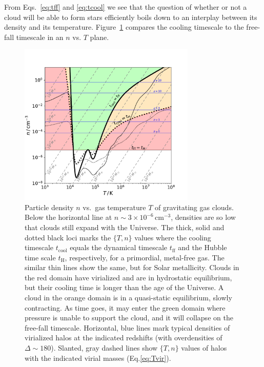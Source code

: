 \documentclass[useAMS]{aa}
\begin{document}
From Eqs.~\ref{eq:tff} and \ref{eq:tcool} we see that the question of whether or not a cloud will be able to form stars efficiently boils down to an interplay between its density and its temperature.
Figure~\ref{fig:cooling} compares the cooling timescale to the free-fall timescale in an $n$ vs. $T$ plane. 
\begin{figure}[!t]
    \centering
    \includegraphics [width=0.75\textwidth] {cooling.pdf}
    \caption{Particle density $n$ vs.~gas temperature $T$ of gravitating gas clouds.
    Below the horizontal line at $n\sim3\times10^{-6}\,\mathrm{cm}^{-3}$, densities are so low that clouds still expand with the Universe.
    The thick, solid and dotted black loci marks the $\{T,n\}$ values where the cooling timescale $t_\mathrm{cool}$ equals the dynamical timescale $t_\mathrm{ff}$ and the Hubble time scale $t_\mathrm{H}$, respectively, for a primordial, metal-free gas.
    The similar thin lines show the same, but for Solar metallicity.
    Clouds in the red domain have virialized and are in hydrostatic equilibrium, but their cooling time is longer than the age of the Universe.
    A cloud in the orange domain is in a quasi-static equilibrium, slowly contracting.
    As time goes, it may enter the green domain where pressure is unable to support the cloud, and it will collapse on the free-fall timescale.
    Horizontal, blue lines mark typical densities of virialized halos at the indicated redshifts (with overdensities of $\Delta\sim180$).
    Slanted, gray dashed lines show $\{T,n\}$ values of halos with the indicated virial masses (Eq.\ref{eq:Tvir}).
    }
    \label{fig:cooling}
\end{figure}
\end{document}
